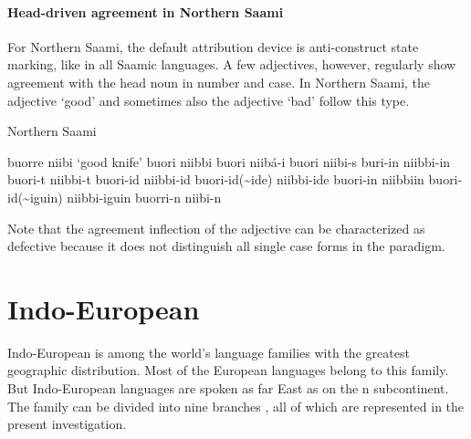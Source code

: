 \paragraph*{Head\hyp{}driven agreement in Northern Saami}
For Northern Saami, the default attribution device is anti\hyp{}construct state marking, like in all Saamic languages. A few adjectives, however, regularly show agreement with the head noun in number and case. In Northern Saami, the adjective ‘good’ and sometimes also the adjective ‘bad’ follow this type.
\begin{exe}
\settowidth{}
\ex \rm{Northern Saami \citep[83]{nickel1990}}
\begin{xlist}
\ex	buorre niibi						\rm{‘good knife’}	
\ex	buori niibbi										
\ex	buori niibá-i										
\ex	buori niibi-s										
\ex	buri-in niibbi-in										
\ex	buori-t niibbi-t										
\ex	buori-id niibbi-id									
\ex	buori-id(\textasciitilde ide) niibbi-ide						
\ex	buori-in niibbiin										
\ex	buori-id(\textasciitilde iguin) niibbi-iguin					
\ex	buorri-n niibi-n										
\end{xlist}
\end{exe}
Note that the agreement inflection of the adjective can be characterized as defective because it does not distinguish all single case forms in the paradigm.

\section{Indo-European}
Indo-European is among the world's language families with the greatest geographic distribution. Most of the European languages belong to this family. But Indo-European languages are spoken as far East as on the n subcontinent. The family can be divided into nine branches \citep[218]{salminen2007}, all of which are represented in the present investigation.

